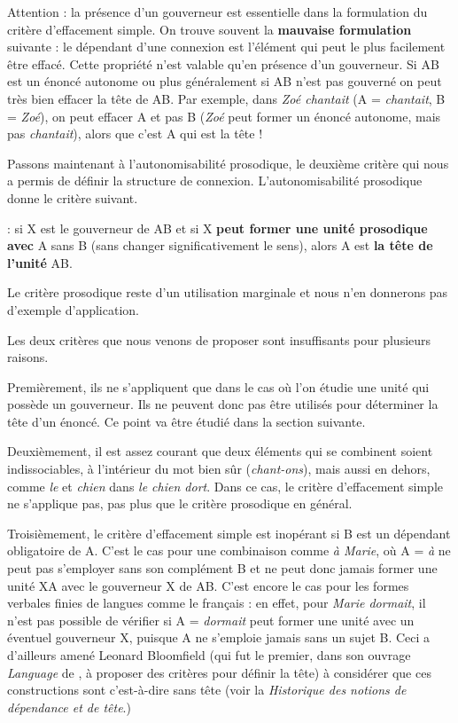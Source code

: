 Attention : la présence d’un gouverneur est essentielle dans la formulation du  critère d’effacement simple. On trouve souvent la \textbf{mauvaise formulation} suivante : le dépendant d’une connexion est l’élément qui peut le plus facilement être effacé. Cette propriété n’est valable qu’en présence d’un gouverneur. Si AB est un énoncé autonome ou plus généralement si AB n’est pas gouverné on peut très bien effacer la tête de AB. Par exemple, dans \textit{Zoé chantait} (A = \textit{chantait}, B = \textit{Zoé}), on peut effacer A et pas B (\textit{Zoé} peut former un énoncé autonome, mais pas \textit{chantait}), alors que c’est A qui est la tête !

Passons maintenant à l’autonomisabilité prosodique, le deuxième critère qui nous a permis de définir la structure de connexion. L’autonomisabilité prosodique donne le critère suivant.

{: si X est le gouverneur de AB et si X \textbf{peut former une unité prosodique avec} A sans B (sans changer significativement le sens), alors A est \textbf{la tête de l’unité} AB.}

Le critère prosodique reste d'un utilisation marginale et nous n'en donnerons pas d'exemple d'application.

Les deux critères que nous venons de proposer sont insuffisants pour plusieurs raisons.

Premièrement, ils ne s’appliquent que dans le cas où l’on étudie une unité qui possède un gouverneur. Ils ne peuvent donc pas être utilisés pour déterminer la tête d’un énoncé. Ce point va être étudié dans la section suivante.

Deuxièmement, il est assez courant que deux éléments qui se combinent soient indissociables, à l’intérieur du mot bien sûr (\textit{chant-ons}), mais aussi en dehors, comme \textit{le} et \textit{chien} dans \textit{le chien dort}. Dans ce cas, le critère d’effacement simple ne s’applique pas, pas plus que le critère prosodique en général.

Troisièmement, le critère d’effacement simple est inopérant si B est un dépendant obligatoire de A. C’est le cas pour une combinaison comme \textit{à Marie}, où A = \textit{à} ne peut pas s’employer sans son complément B et ne peut donc jamais former une unité XA avec le gouverneur X de AB. C’est encore le cas pour les formes verbales finies de langues comme le français : en effet, pour \textit{Marie dormait}, il n’est pas possible de vérifier si A = \textit{dormait} peut former une unité avec un éventuel gouverneur X, puisque A ne s’emploie jamais sans un sujet B. Ceci a d’ailleurs amené Leonard Bloomfield (qui fut le premier, dans son ouvrage \textit{Language} de \citeyear{bloomfield1933language}, à proposer des critères pour définir la tête) à considérer que ces constructions sont  c’est-à-dire sans tête (voir la  \textit{Historique des notions de dépendance et de tête}.)

